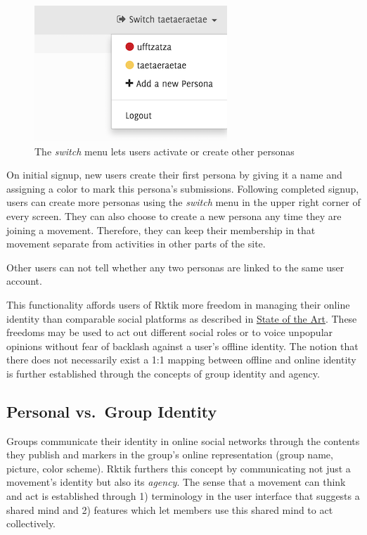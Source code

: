 \begin{figure}[htbp]
\centering
\includegraphics{img/switch.png}
\caption{The \emph{switch} menu lets users activate or create other
personas}
\end{figure}

On initial signup, new users create their first persona by giving it a
name and assigning a color to mark this persona's submissions. Following
completed signup, users can create more personas using the \emph{switch}
menu in the upper right corner of every screen. They can also choose to
create a new persona any time they are joining a movement. Therefore,
they can keep their membership in that movement separate from activities
in other parts of the site.

Other users can not tell whether any two personas are linked to the same
user account.

This functionality affords users of Rktik more freedom in managing their
online identity than comparable social platforms as described in
\hyperref[state-of-the-art]{State of the Art}. These freedoms may be
used to act out different social roles or to voice unpopular opinions
without fear of backlash against a user's offline identity. The notion
that there does not necessarily exist a 1:1 mapping between offline and
online identity is further established through the concepts of group
identity and agency.

\subsection{Personal vs.~Group
Identity}\label{personal-vs.group-identity}

Groups communicate their identity in online social networks through the
contents they publish and markers in the group's online representation
(group name, picture, color scheme). Rktik furthers this concept by
communicating not just a movement's identity but also its \emph{agency}.
The sense that a movement can think and act is established through 1)
terminology in the user interface that suggests a shared mind and 2)
features which let members use this shared mind to act collectively.


